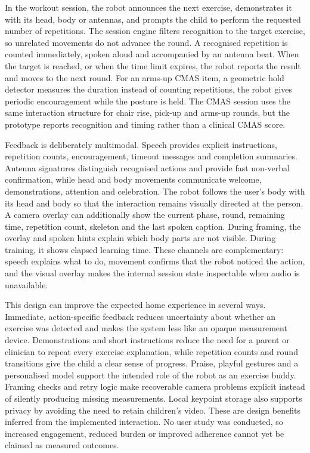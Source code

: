 In the workout session, the robot announces the next exercise, demonstrates it with its head, body or antennas, and prompts the child to perform the requested number of repetitions. The session engine filters recognition to the target exercise, so unrelated movements do not advance the round. A recognised repetition is counted immediately, spoken aloud and accompanied by an antenna beat. When the target is reached, or when the time limit expires, the robot reports the result and moves to the next round. For an arms-up CMAS item, a geometric hold detector measures the duration instead of counting repetitions, the robot gives periodic encouragement while the posture is held. The CMAS session uses the same interaction structure for chair rise, pick-up and arms-up rounds, but the prototype reports recognition and timing rather than a clinical CMAS score.

Feedback is deliberately multimodal. Speech provides explicit instructions, repetition counts, encouragement, timeout messages and completion summaries. Antenna signatures distinguish recognised actions and provide fast non-verbal confirmation, while head and body movements communicate welcome, demonstrations, attention and celebration. The robot follows the user's body with its head and body so that the interaction remains visually directed at the person. A camera overlay can additionally show the current phase, round, remaining time, repetition count, skeleton and the last spoken caption. During framing, the overlay and spoken hints explain which body parts are not visible. During training, it shows elapsed learning time. These channels are complementary: speech explains what to do, movement confirms that the robot noticed the action, and the visual overlay makes the internal session state inspectable when audio is unavailable.

This design can improve the expected home experience in several ways. Immediate, action-specific feedback reduces uncertainty about whether an exercise was detected and makes the system less like an opaque measurement device. Demonstrations and short instructions reduce the need for a parent or clinician to repeat every exercise explanation, while repetition counts and round transitions give the child a clear sense of progress. Praise, playful gestures and a personalised model support the intended role of the robot as an exercise buddy. Framing checks and retry logic make recoverable camera problems explicit instead of silently producing missing measurements. Local keypoint storage also supports privacy by avoiding the need to retain children's video. These are design benefits inferred from the implemented interaction. No user study was conducted, so increased engagement, reduced burden or improved adherence cannot yet be claimed as measured outcomes.

